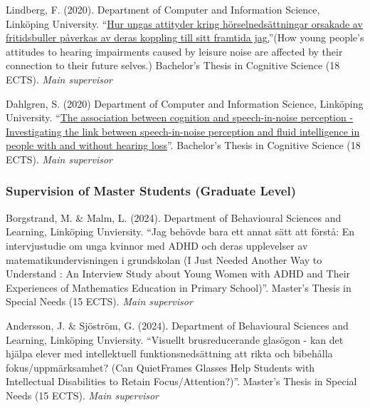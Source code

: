 \documentclass[]{article}
\begin{document}
Lindberg, F. (2020). Department of Computer and Information Science,
Linköping University.
``\href{http://liu.diva-portal.org/smash/record.jsf?dswid=-6296&faces-redirect=true&language=en&searchType=SIMPLE&query=Marsja&af=\%5B\%5D&aq=\%5B\%5B\%5D\%5D&aq2=\%5B\%5B\%5D\%5D&aqe=\%5B\%5D&pid=diva2\%3A1468019&noOfRows=50&sortOrder=author_sort_asc&sortOrder2=title_sort_asc&onlyFullText=false&sf=undergraduate}{Hur
ungas attityder kring hörselnedsättningar orsakade av fritidsbuller
påverkas av deras koppling till sitt framtida jag.}''(How young people's
attitudes to hearing impairments caused by leisure noise are affected by
their connection to their future selves.) Bachelor's Thesis in Cognitive
Science (18 ECTS). \emph{Main supervisor}

Dahlgren, S. (2020) Department of Computer and Information Science,
Linköping University.
``\href{http://liu.diva-portal.org/smash/record.jsf?dswid=-6296&faces-redirect=true&language=en&searchType=SIMPLE&query=Marsja&af=\%5B\%5D&aq=\%5B\%5B\%5D\%5D&aq2=\%5B\%5B\%5D\%5D&aqe=\%5B\%5D&pid=diva2\%3A1443600&noOfRows=50&sortOrder=author_sort_asc&sortOrder2=title_sort_asc&onlyFullText=false&sf=undergraduate}{The
association between cognition and speech-in-noise perception -
Investigating the link between speech-in-noise perception and fluid
intelligence in people with and without hearing loss}''. Bachelor's
Thesis in Cognitive Science (18 ECTS). \emph{Main supervisor}

\subsubsection{Supervision of Master Students (Graduate
Level)}\label{supervision-of-master-students-graduate-level}

Borgstrand, M. \& Malm, L. (2024). Department of Behavioural Sciences
and Learning, Linköping Unviersity. ``Jag behövde bara ett annat sätt
att förstå: En intervjustudie om unga kvinnor med ADHD och deras
upplevelser av matematikundervisningen i grundskolan (I Just Needed
Another Way to Understand : An Interview Study about Young Women with
ADHD and Their Experiences of Mathematics Education in Primary
School)''. Master's Thesis in Special Needs (15 ECTS). \emph{Main
supervisor}

Andersson, J. \& Sjöström, G. (2024). Department of Behavioural Sciences
and Learning, Linköping Unviersity. ``Visuellt brusreducerande glasögon
- kan det hjälpa elever med intellektuell funktionsnedsättning att rikta
och bibehålla fokus/uppmärksamhet? (Can QuietFrames Glasses Help
Students with Intellectual Disabilities to Retain Focus/Attention?)''.
Master's Thesis in Special Needs (15 ECTS). \emph{Main supervisor}
\end{document}
